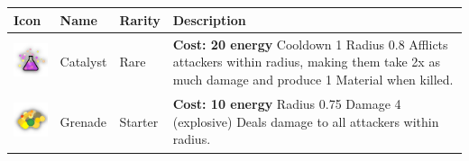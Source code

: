 \begin{table}[H]
    \centering
    \begin{tabular}{m{15mm}m{20mm}lm{}}
        \toprule
        \textbf{Icon}                                                          & \textbf{Name}   & \textbf{Rarity} & \textbf{Description}                                                                                                                                                                                                                                                  \\
        \midrule
        \includegraphics[height=15mm]{img/Icons/Abilities/Catalyst.png}        & Catalyst        & Rare            &
        \footnotesize{\textbf{Cost: 20 energy} \newline Cooldown 1 \newline Radius 0.8 \newline Afflicts attackers within radius, making them take 2x as much damage and produce 1 Material when killed.}                                                                                                                                                                                  \\

        \includegraphics[height=15mm]{img/Icons/Abilities/Grenade.png}         & Grenade         & Starter         &
        \footnotesize{\textbf{Cost: 10 energy} \newline Radius 0.75 \newline Damage 4 (explosive) \newline Deals damage to all attackers within radius.}                                                                                                                                                                                                                                   \\


\end{tabular}
\end{table}
